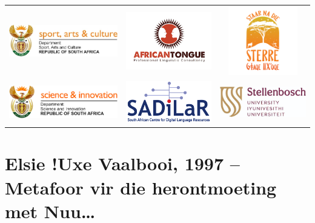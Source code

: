 \begin{tabular}{lcc}
    \includegraphics[width=6.3cm]{dsac.jpg} &
    \includegraphics[width=5cm]{at.jpg} &
    \includegraphics[width=3cm]{sterre.png} \\
    \includegraphics[width=6cm]{dsi.png} &
    \includegraphics[width=5cm]{sadilar.png} &
    \includegraphics[width=5cm]{sun.jpg} \\
\end{tabular}

\newpage



\section*{Elsie !Uxe Vaalbooi, 1997 -- Metafoor vir die herontmoeting met
N\textipa{\textvertline}uu\ldots}

